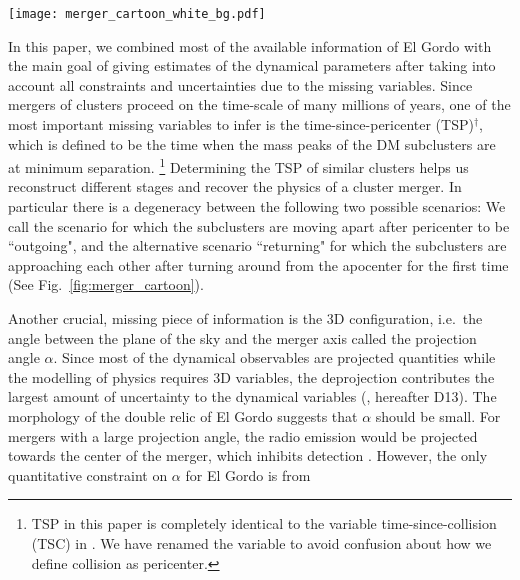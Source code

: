 \documentclass[ucdthesis.tex]{subfiles}
\begin{document}
    \begin{figure*}
    	\texttt{[image: merger\_cartoon\_white\_bg.pdf]}
    	\caption{Illustration of the spatial location of different components of El Gordo at
    		different stages of the merger. Earlier stages (with a smaller TSP) are on the left side of later stages. The rightmost returning scenario is preferred from our simulation.} 
    	\label{fig:merger_cartoon}
    \end{figure*}
    In this paper, we combined most of the available information of El Gordo
    with the main goal of giving estimates of
    the dynamical parameters after taking into account all
    constraints and uncertainties due to the missing variables.
    Since mergers of clusters proceed on the time-scale of many millions of
    years, one of the most important missing variables to infer is the
    time-since-pericenter (TSP)$^\dagger$, which is defined to be the time when the mass
    peaks of the DM subclusters are at minimum separation. \footnote{TSP in this
    	paper is completely identical to the variable time-since-collision (TSC) in
    	\cite{Dawson12}. We have renamed the variable to avoid confusion about how we
    define collision as pericenter.}
    Determining the TSP of similar clusters helps
    us reconstruct different stages and recover the physics of a cluster merger.
    In particular there is a degeneracy between the following two possible
    scenarios:
    We call the scenario for which the subclusters are
    moving apart after pericenter to be ``outgoing", and the alternative scenario 
    ``returning" for which the subclusters are approaching each other after turning
    around from the apocenter for the first time (See
    Fig.~\ref{fig:merger_cartoon}).\par
    Another crucial, missing piece of information is the 3D
    configuration, i.e.\ the angle between the plane of the sky and the merger
    axis called the projection angle $\alpha$. Since most of the dynamical
    observables are projected quantities while the modelling of physics
    requires 3D
    variables, the deprojection contributes the
    largest amount of uncertainty to the dynamical variables
    (\citealt{D13}, hereafter D13). The morphology of the double relic of El Gordo suggests that
    $\alpha$ should be small. 
    For mergers with a
    large projection angle, the radio emission would be projected towards the
    center of the merger, which inhibits detection \citep{Vazza11}.
    However, the only quantitative constraint on $\alpha$ for El Gordo is from
\end{document}

